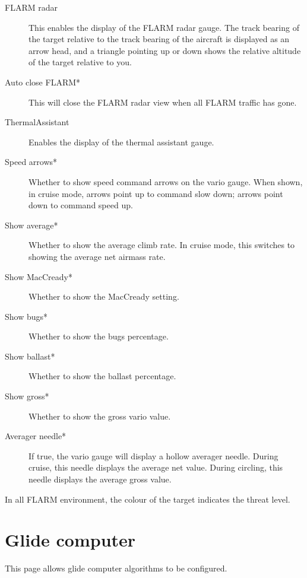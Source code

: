 \begin{description}
\item[FLARM radar]  \label{conf:flarmdisplay} This enables the display of the FLARM 
  radar gauge. The track bearing of the target relative to the track bearing of the 
  aircraft is displayed as an arrow head, and a triangle pointing up or down shows 
  the relative altitude of the target relative to you.
\item[Auto close FLARM*]  This will close the FLARM radar view when all FLARM traffic has gone.
\item[ThermalAssistant] \label{conf:thermalassistant} Enables the display of the
  thermal assistant gauge.

\item[Speed arrows*]  \label{conf:variogauge} Whether to show speed command 
  arrows on the vario gauge.
  When shown, in cruise mode, arrows point up to command slow down; arrows point down 
  to command speed up.
\item[Show average*]  Whether to show the average climb rate.  In cruise mode, this 
  switches to showing the average net airmass rate.
\item[Show MacCready*]  Whether to show the MacCready setting.
\item[Show bugs*]  Whether to show the bugs percentage.
\item[Show ballast*]  Whether to show the ballast percentage.
\item[Show gross*]  Whether to show the gross vario value.
\item[Averager needle*]  If true, the vario gauge will display a hollow averager
  needle. During cruise, this needle displays the average net value. During circling, 
  this needle displays the average gross value.
\end{description}

In all FLARM environment, the colour of the target indicates the threat level.


\clearpage
\section{Glide computer}\label{sec:final-glide}

This page allows glide computer algorithms to be configured.

